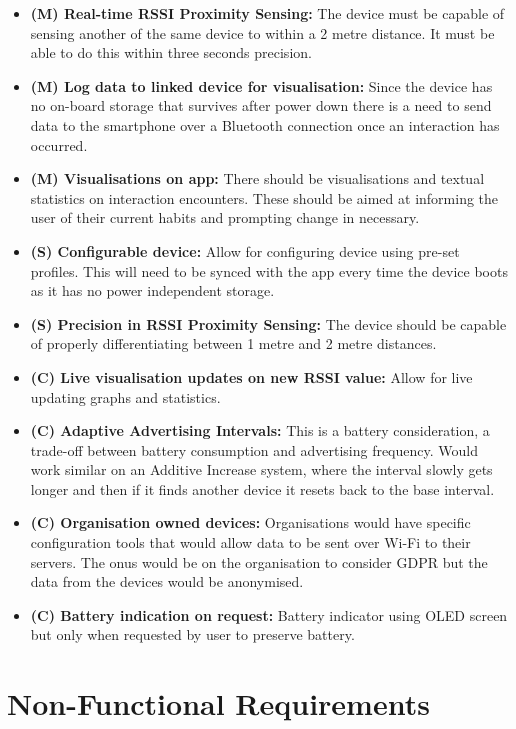 \documentclass{l4proj}
\begin{document}
\begin{itemize}
    \item \textbf{(M) Real-time RSSI Proximity Sensing: } The device must be capable of sensing another of the same device to within a 2 metre distance. It must be able to do this within three seconds precision.
    \item \textbf{(M) Log data to linked device for visualisation: } Since the device has no on-board storage that survives after power down there is a need to send data to the smartphone over a Bluetooth connection once an interaction has occurred.
    \item \textbf{(M) Visualisations on app: } There should be visualisations and textual statistics on interaction encounters. These should be aimed at informing the user of their current habits and prompting change in necessary.
    \item \textbf{(S) Configurable device: } Allow for configuring device using pre-set profiles. This will need to be synced with the app every time the device boots as it has no power independent storage.
    \item \textbf{(S) Precision in RSSI Proximity Sensing: } The device should be capable of properly differentiating between 1 metre and 2 metre distances.
    \item \textbf{(C) Live visualisation updates on new RSSI value: } Allow for live updating graphs and statistics.
    \item \textbf{(C) Adaptive Advertising Intervals: } This is a battery consideration, a trade-off between battery consumption and advertising frequency. Would work similar on an Additive Increase system, where the interval slowly gets longer and then if it finds another device it resets back to the base interval.
    \item \textbf{(C) Organisation owned devices: } Organisations would have specific configuration tools that would allow data to be sent over Wi-Fi to their servers. The onus would be on the organisation to consider GDPR but the data from the devices would be anonymised.
    \item \textbf{(C) Battery indication on request: } Battery indicator using OLED screen but only when requested by user to preserve battery.
\end{itemize}

\section{Non-Functional Requirements} \label{sec:non_func_requirements}
\end{document}
